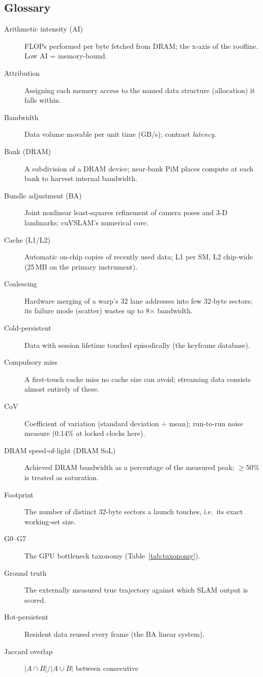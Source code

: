 \subsection{Glossary}
\label{app:glossary}

\begin{description}
\item[Arithmetic intensity (AI)] FLOPs performed per byte fetched from
DRAM; the x-axis of the roofline. Low AI = memory-bound.
\item[Attribution] Assigning each memory access to the named data structure
(allocation) it falls within.
\item[Bandwidth] Data volume movable per unit time (GB/s); contrast
\emph{latency}.
\item[Bank (DRAM)] A subdivision of a DRAM device; near-bank PiM places
compute at each bank to harvest internal bandwidth.
\item[Bundle adjustment (BA)] Joint nonlinear least-squares refinement of
camera poses and 3-D landmarks; cuVSLAM's numerical core.
\item[Cache (L1/L2)] Automatic on-chip copies of recently used data; L1 per
SM, L2 chip-wide (25\,MB on the primary instrument).
\item[Coalescing] Hardware merging of a warp's 32 lane addresses into few
32-byte sectors; its failure mode (scatter) wastes up to 8$\times$
bandwidth.
\item[Cold-persistent] Data with session lifetime touched episodically
(the keyframe database).
\item[Compulsory miss] A first-touch cache miss no cache size can avoid;
streaming data consists almost entirely of these.
\item[CoV] Coefficient of variation (standard deviation $\div$ mean);
run-to-run noise measure (0.14\% at locked clocks here).
\item[DRAM speed-of-light (DRAM SoL)] Achieved DRAM bandwidth as a
percentage of the measured peak; $\geq$50\% is treated as saturation.
\item[Footprint] The number of distinct 32-byte sectors a launch touches,
i.e.\ its exact working-set size.
\item[G0--G7] The GPU bottleneck taxonomy (Table~\ref{tab:taxonomy}).
\item[Ground truth] The externally measured true trajectory against which
SLAM output is scored.
\item[Hot-persistent] Resident data reused every frame (the BA linear
system).
\item[Jaccard overlap] $|A \cap B| / |A \cup B|$ between consecutive

\end{description}
